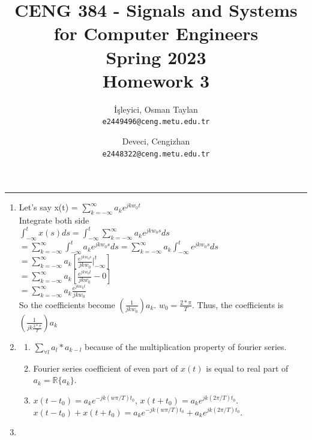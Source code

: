 \documentclass[10pt,a4paper, margin=1in]{article}
\author{
  İşleyici, Osman Taylan\\
  \texttt{e2449496@ceng.metu.edu.tr}
  \and
  Deveci, Cengizhan\\
  \texttt{e2448322@ceng.metu.edu.tr}
}
\title{CENG 384 - Signals and Systems for Computer Engineers \\
Spring 2023 \\
Homework 3}
\begin{document}
\maketitle



\noindent\rule{19cm}{1.2pt}

\begin{enumerate}

\item %
Let's say x(t) = $\sum_{k = -\infty}^{\infty}a_ke^{jkw_0t}$ \\

Integrate both side \\

$\int_{-\infty}^{t}x(s)ds = \int_{-\infty}^{t}\sum_{k = -\infty}^{\infty}a_ke^{jkw_0s}ds$ \\

$=\sum_{k = -\infty}^{\infty}\int_{-\infty}^{t}a_ke^{jkw_0s}ds = \sum_{k = -\infty}^{\infty}a_k\int_{-\infty}^{t}e^{jkw_0s}ds$ \\

$=\sum_{k = -\infty}^{\infty}a_k [\frac{e^{jkw_0s}}{jkw_0}|_{-\infty}^t]$ \\

$=\sum_{k = -\infty}^{\infty}a_k [\frac{e^{jkw_0t}}{jkw_0} - 0]$ \\

$=\sum_{k = -\infty}^{\infty}a_k \frac{e^{jkw_0t}}{jkw_0}$ \\

So the coefficients become $(\frac{1}{jkw_0})a_k$. $w_0 = \frac{2*\pi}{T}$. Thus, the coefficients is $(\frac{1}{jk\frac{2*\pi}{T}})a_k$

\item %
	\begin{enumerate}
    \item $\sum\limits_{\forall l}a_l*a_{k-l}$ because of the multiplication property of fourier series.
    \item Fourier series coefficient of even part of $x(t)$ is equal to real part of $a_k = \mathbb{R} \{a_k\}$.
	\item $x(t-t_0) = a_ke^{-jk(w\pi/T)t_0}$, $x(t+t_0) = a_ke^{jk(2\pi/T)t_0}$. $x(t-t_0) + x(t+t_0) = a_ke^{-jk(w\pi/T)t_0} + a_ke^{jk(2\pi/T)t_0}$.
    \end{enumerate}

\item %


\end{enumerate}
\end{document}
